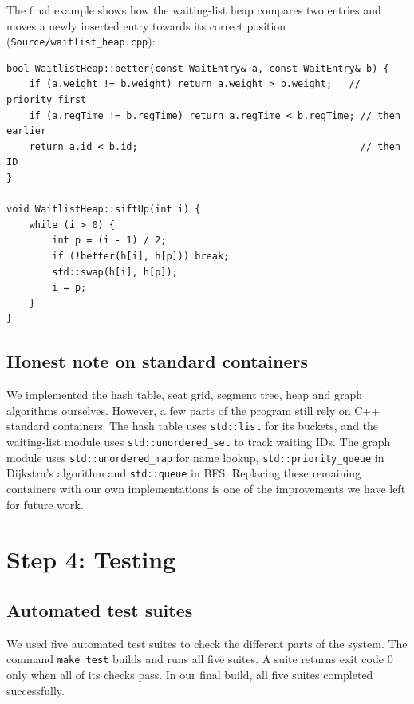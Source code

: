 \documentclass[11pt,a4paper]{article}
\newcommand{\code}[1]{\texttt{#1}}
\begin{document}
The final example shows how the waiting-list heap compares two entries and
moves a newly inserted entry towards its correct position
(\code{Source/waitlist\_heap.cpp}):

\begin{lstlisting}[caption={Heap ordering and sift-up.}]
bool WaitlistHeap::better(const WaitEntry& a, const WaitEntry& b) {
    if (a.weight != b.weight) return a.weight > b.weight;   // priority first
    if (a.regTime != b.regTime) return a.regTime < b.regTime; // then earlier
    return a.id < b.id;                                       // then ID
}

void WaitlistHeap::siftUp(int i) {
    while (i > 0) {
        int p = (i - 1) / 2;
        if (!better(h[i], h[p])) break;
        std::swap(h[i], h[p]);
        i = p;
    }
}
\end{lstlisting}

\subsection{Honest note on standard containers}
We implemented the hash table, seat grid, segment tree, heap and graph
algorithms ourselves. However, a few parts of the program still rely on C++
standard containers. The hash table uses \code{std::list} for its buckets, and
the waiting-list module uses \code{std::unordered\_set} to track waiting IDs.
The graph module uses \code{std::unordered\_map} for name lookup,
\code{std::priority\_queue} in Dijkstra's algorithm and \code{std::queue} in BFS.
Replacing these remaining containers with our own implementations is one of
the improvements we have left for future work.

\section{Step 4: Testing}

\subsection{Automated test suites}
We used five automated test suites to check the different parts of the system.
The command \code{make test} builds and runs all five suites. A suite returns
exit code 0 only when all of its checks pass. In our final build, all five
suites completed successfully.
\end{document}
